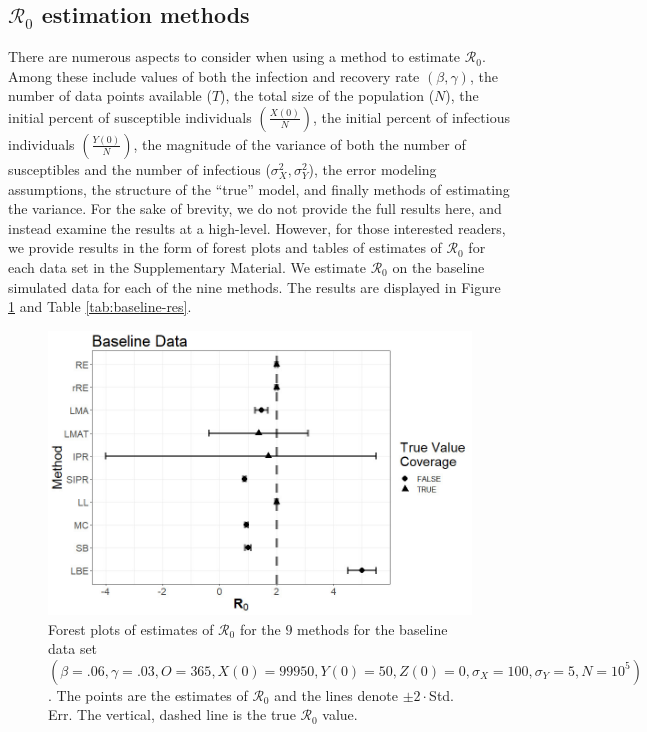 \documentclass[12pt]{article}
\newcommand{\xxsir}{\ensuremath{9} } %
\newcommand{\wxxsir}{nine } %
\newcommand{\rr}{\ensuremath{\mathcal{R}_0}}
\begin{document}
\subsection{$\rr$ estimation methods}\label{sec:results}
There are numerous aspects to consider when using a method to estimate $\rr$.  Among these include values of both the infection and recovery rate $(\beta, \gamma)$, the number of data points available ($T$), the total size of the population ($N$), the initial percent of susceptible individuals $\left (\frac{X(0)}{N}\right)$, the initial percent of infectious individuals $\left (\frac{Y(0)}{N}\right )$, the magnitude of the variance of both the number of susceptibles and the number of infectious ($\sigma_X^2, \sigma_Y^2$), the error modeling assumptions, the structure of the ``true'' model, and finally methods of estimating the variance.  For the sake of brevity, we do not provide the full results here, and instead examine the results at a high-level.  However, for those interested readers, we provide results in the form of forest plots and tables of estimates of $\rr$ for each data set in the Supplementary Material.  We estimate $\rr$ on the baseline simulated data for each of the \wxxsir methods.  The results are displayed in Figure \ref{fig:baseline-res} and Table \ref{tab:baseline-res}.
\begin{figure}[H]
  \centering
  \includegraphics[scale=0.5]{images/BaseBase.jpg}
  \caption{Forest plots of estimates of $\rr$ for the \xxsir methods for the baseline data set $(\beta=.06, \gamma=.03, O=365, X(0)=99950, Y(0)=50, Z(0)=0, \sigma_X=100, \sigma_Y=5, N=10^5)$.  The points are the estimates of $\rr$ and the lines denote $\pm 2\cdot $Std. Err.  The vertical, dashed line is the true $\rr$ value.}\label{fig:baseline-res}
  \end{figure}
\end{document}

